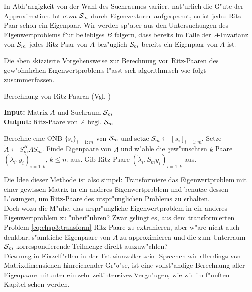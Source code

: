 In Abh"angigkeit von der Wahl
des Suchraumes variiert nat"urlich die G"ute der Approximation. Ist etwa $\S_m$
durch Eigenvektoren aufgespannt, so ist jedes Ritz-Paar schon ein Eigenpaar.
Wir werden sp"ater aus den Untersuchungen des Eigenwertproblems f"ur beliebiges $B$ folgern,
dass bereits im Falle der $A$-Invarianz von $\S_m$ jedes Ritz-Paar von $A$ bez"uglich $\S_m$ bereits ein Eigenpaar von $A$ ist.

\newpage

Die eben skizzierte Vorgehensweise zur Berechnung von Ritz-Paaren des gew"ohnlichen Eigenwertproblems
l"asst sich algorithmisch wie folgt zusammenfassen.

\begin{algorithm}
\caption{Berechnung von Ritz-Paaren (Vgl. \cite[Algorithmus 4.5, S. 98]{saad})}\label{alg:chap3:rp}
\vspace{.15cm}
\textbf{Input:} Matrix $A$ und Suchraum $\S_m$\\
\textbf{Output:} Ritz-Paare von $A$ bzgl. $\S_m$
\begin{algorithmic}[1]
\State Berechne eine ONB $\{s_i\}_{i=1:m}$ von $\S_m$ und setze $S_m\gets[s_i]_{i=1:m}$.
\State Setze $\widetilde{A}\gets S_m^H A S_m$.
\State Finde Eigenpaare von $\widetilde{A}$ und w"ahle die gew"unschten $k$ Paare $(\widetilde{\lambda}_i, y_i)_{i=1:k}$, $k\le m$ aus.
\State Gib Ritz-Paare $(\widetilde{\lambda}_i, S_m y_i)_{i=1:k}$ aus.
\end{algorithmic}
\end{algorithm}

Die Idee dieser Methode ist also simpel: Transformiere das Eigenwertproblem mit
einer gewissen Matrix in ein anderes Eigenwertproblem und benutze dessen L"osungen,
um Ritz-Paare des urspr"unglichen Problems zu erhalten.\\

Doch wozu die M"uhe, das urspr"ungliche Eigenwertproblem in ein anderes
Eigenwertproblem zu "uberf"uhren? Zwar gelingt es, aus dem transformierten Problem
\eqref{eq:chap3:transform} Ritz-Paare zu extrahieren, aber w"are nicht auch denkbar,
s"amtliche Eigenpaare von $A$ zu approximieren und die zum Unterraum $\S_m$
korrespondierende Teilmenge direkt auszuw"ahlen?\\

Dies mag in Einzelf"allen in der Tat sinnvoller sein. Sprechen wir allerdings
von Matrixdimensionen hinreichender Gr"o"se, ist eine vollst"andige
Berechnung aller Eigenpaare mitunter ein sehr zeitintensives Vergn"ugen, wie wir im f"unften Kapitel sehen werden.\\

